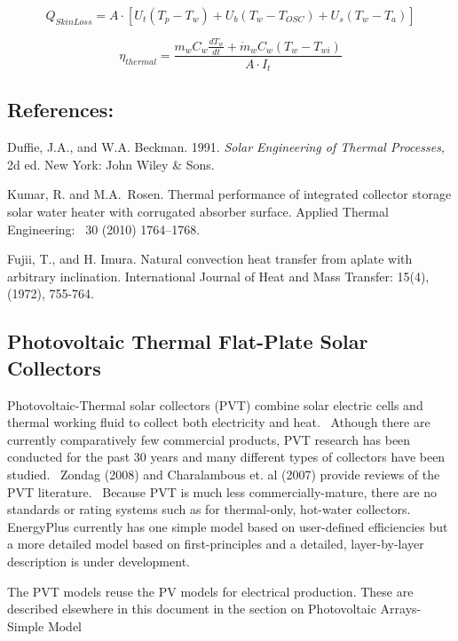 \begin{equation}
{Q_{SkinLoss}} = A \cdot \left[ {{U_t}\left( {{T_p} - {T_w}} \right) + {U_b}\left( {{T_w} - {T_{OSC}}} \right) + {U_s}\left( {{T_w} - {T_a}} \right)} \right]
\end{equation}

\begin{equation}
{\eta_{thermal}} = \frac{{{m_w}{C_w}\frac{{d{T_w}}}{{dt}} + {{\dot m}_w}{C_w}\left( {{T_w} - {T_{wi}}} \right)}}{{A \cdot {I_t}}}
\end{equation}

\subsection{References:}\label{references-1-016}

Duffie, J.A., and W.A. Beckman. 1991. \emph{Solar Engineering of Thermal Processes,} 2d ed. New York: John Wiley \& Sons.

Kumar, R. and M.A.~Rosen. Thermal performance of integrated collector storage solar water heater with corrugated absorber surface. Applied Thermal Engineering:~ 30 (2010) 1764--1768.

Fujii, T., and H. Imura. Natural convection heat transfer from aplate with arbitrary inclination. International Journal of Heat and Mass Transfer: 15(4), (1972), 755-764.

\subsection{Photovoltaic Thermal Flat-Plate Solar Collectors}\label{photovoltaic-thermal-flat-plate-solar-collectors}

Photovoltaic-Thermal solar collectors (PVT) combine solar electric cells and thermal working fluid to collect both electricity and heat.~ Athough there are currently comparatively few commercial products, PVT research has been conducted for the past 30 years and many different types of collectors have been studied.~ Zondag (2008) and Charalambous et. al (2007) provide reviews of the PVT literature.~ Because PVT is much less commercially-mature, there are no standards or rating systems such as for thermal-only, hot-water collectors.~ EnergyPlus currently has one simple model based on user-defined efficiencies but a more detailed model based on first-principles and a detailed, layer-by-layer description is under development.

The PVT models reuse the PV models for electrical production. These are described elsewhere in this document in the section on Photovoltaic Arrays-Simple Model

